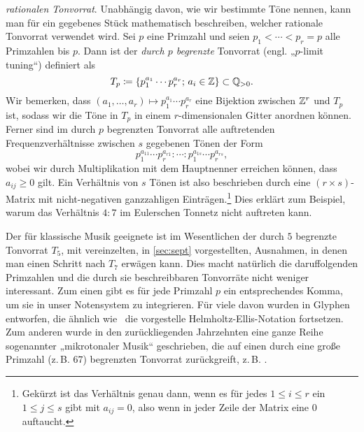 \emph{rationalen Tonvorrat}.  Unabhängig davon, wie wir bestimmte Töne nennen,
kann man für ein gegebenes Stück mathematisch beschreiben, welcher rationale
Tonvorrat verwendet wird.  Sei $p$ eine Primzahl und seien $p_1<\dotsb<p_r=p$
alle Primzahlen bis $p$. Dann ist der \emph{durch $p$ begrenzte} Tonvorrat
(engl. „$p$-limit tuning“) definiert als
\[T_p\coloneqq\{p_1^{a_1}\dotsm p_r^{a_r};\,a_i\in\mathbb{Z}\}\subset \mathbb{Q}_{>0}.\]%
Wir bemerken, dass $(a_1,\dotsc,a_r)\mapsto p_1^{a_1}\dotsm p_r^{a_r}$ eine
Bijektion zwischen $\mathbb{Z}^r$ und $T_p$ ist, sodass wir die Töne in $T_p$ in einem
$r$-dimensionalen Gitter anordnen können. Ferner sind im durch $p$ begrenzten
Tonvorrat alle auftretenden Frequenzverhältnisse zwischen $s$ gegebenen Tönen
der Form
\[p_1^{a_{11}}\dotsm p_r^{a_{r1}}:\dotsb:p_1^{a_{1s}}\dotsm p_r^{a_{rs}},\]%
wobei wir durch Multiplikation mit dem Hauptnenner erreichen können, dass
$a_{ij}\ge 0$ gilt. Ein Verhältnis von $s$ Tönen ist also beschrieben durch eine
$(r\times s)$-Matrix mit nicht-negativen ganzzahligen
Einträgen.\footnote{Gekürzt ist das Verhältnis genau dann, wenn es für jedes
  $1\le i\le r$ ein $1\le j\le s$ gibt mit $a_{ij}=0$, also wenn in jeder Zeile
  der Matrix eine $0$ auftaucht.} Dies erklärt zum Beispiel, warum das
Verhältnis $4:7$ im Eulerschen Tonnetz nicht auftreten kann.

Der für klassische Musik geeignete ist im Wesentlichen der durch $5$ begrenzte
Tonvorrat $T_5$, mit vereinzelten, in \cref{sec:sept} vorgestellten, Ausnahmen,
in denen man einen Schritt nach $T_7$ erwägen kann.  Dies macht natürlich die
daruffolgenden Primzahlen und die durch sie beschreibbaren Tonvorräte nicht
weniger interessant. Zum einen gibt es für jede Primzahl $p$ ein entsprechendes
Komma, um sie in unser Notensystem zu integrieren. Für viele davon wurden in
\cite{HEJI} Glyphen entworfen, die ähnlich wie \septimal\ die vorgestelle
Helmholtz-Ellis-Notation fortsetzen. Zum anderen wurde in den zurückliegenden
Jahrzehnten eine ganze Reihe sogenannter „mikrotonaler Musik“ geschrieben, die
auf einen durch eine große Primzahl (z.\,B. $67$) begrenzten Tonvorrat
zurückgreift, z.\,B. \cite{Nicholson}.

